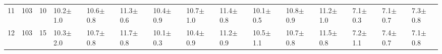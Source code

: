 \begin{table}[ht]
{\begin{tabular}{rrrllllllllllll}
  11 & 103 &  10 & 10.2$\pm$1.0 & 10.6$\pm$0.8 & 11.3$\pm$0.6 & 10.4$\pm$0.9 & 10.7$\pm$1.0 & 11.4$\pm$0.8 & 10.1$\pm$0.5 & 10.8$\pm$0.9 & 11.2$\pm$1.0 & 7.1$\pm$0.3 & 7.1$\pm$0.7 & 7.3$\pm$0.8 \\ 
  12 & 103 &  15 & 10.3$\pm$2.0 & 10.7$\pm$0.8 & 11.7$\pm$0.8 & 10.1$\pm$0.3 & 10.4$\pm$0.9 & 11.2$\pm$0.9 & 10.5$\pm$1.1 & 10.7$\pm$0.8 & 11.5$\pm$0.8 & 7.2$\pm$1.1 & 7.4$\pm$0.7 & 7.1$\pm$0.8 \\ 
   \hline
\end{tabular}
}
\end{table}

